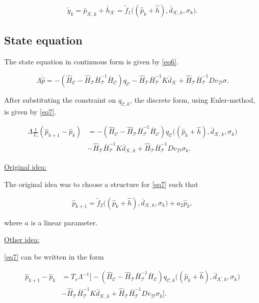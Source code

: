 \begin{equation}
  \label{eq5}
     \tilde{y}_k = \bar{p}_{\mathcal{K},k} + \bar{h}_{\mathcal{K}} = \tilde{f}_1 \big((\hat{p}_k + \hat{h}),\bar{d}_{\mathcal{K},k}, \sigma_k\big).
\end{equation}

\subsection{State equation}

The state equation in continuous form is given by \eqref{eq6}.

\begin{equation}
\label{eq6}
\Lambda \dot{\hat{p}} = - (\hat{H}_{\mathcal{C}} - \hat{H}_{\mathcal{T}} \bar{H}^{-1}_{\mathcal{T}}\bar{H}_{\mathcal{C}})  q_\mathcal{C}  - \hat{H}_{\mathcal{T}} \bar{H}^{-1}_{\mathcal{T}} K \bar{d}_{\mathcal{K}} + \hat{H}_{\mathcal{T}} \bar{H}^{-1}_{\mathcal{T}} D v_{\mathcal{D}} \sigma .
\end{equation}

After substituting the constraint on $q_{\mathcal{C},k}$, the discrete form, using Euler-method, is given by \eqref{eq7}.

\begin{align}
\label{eq7}
\Lambda\nonumber \frac{1}{T_s} (\hat{p}_{k+1} - \hat{p}_k)  &= - (\hat{H}_{\mathcal{C}} - \hat{H}_{\mathcal{T}} \bar{H}^{-1}_{\mathcal{T}}\bar{H}_{\mathcal{C}})  q_{\mathcal{C}}\big ((\hat{p}_k + \hat{h}),\bar{d}_{\mathcal{K},k}, \sigma_k \big) \\ & - \hat{H}_{\mathcal{T}} \bar{H}^{-1}_{\mathcal{T}} K \bar{d}_{\mathcal{K},k} + \hat{H}_{\mathcal{T}} \bar{H}^{-1}_{\mathcal{T}} D v_{\mathcal{D}} \sigma_k.
\end{align}

\underline{Original idea:}

The original idea was to choose a structure for \eqref{eq7} such that 

\begin{equation}
\label{eq8}
\hat{p}_{k+1} = \tilde{f}_2\big( (\hat{p}_k + \hat{h}),\bar{d}_{\mathcal{K},k}, \sigma_k\big) + a_2 \hat{p}_k,
\end{equation}

where $a$ is a linear parameter.

\newpage

\underline{Other idea:} 

\eqref{eq7} can be written in the form

\begin{align}
\label{eq9}
\nonumber  \hat{p}_{k+1} - \hat{p}_k  &= T_s \Lambda^{-1} \big[- (\hat{H}_{\mathcal{C}} - \hat{H}_{\mathcal{T}} \bar{H}^{-1}_{\mathcal{T}}\bar{H}_{\mathcal{C}})  q_{\mathcal{C},k}\big ((\hat{p}_k + \hat{h}),\bar{d}_{\mathcal{K},k}, \sigma_k \big) \\ & - \hat{H}_{\mathcal{T}} \bar{H}^{-1}_{\mathcal{T}} K \bar{d}_{\mathcal{K},k} + \hat{H}_{\mathcal{T}} \bar{H}^{-1}_{\mathcal{T}} D v_{\mathcal{D}} \sigma_k \big].
\end{align}

